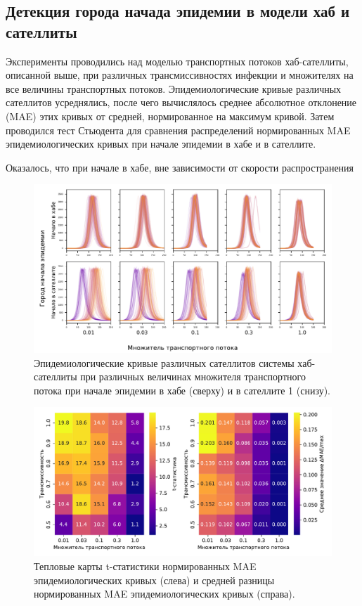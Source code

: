 \documentclass[a4paper,12pt]{article} %
\begin{document}
\subsection{Детекция города начада эпидемии в модели хаб и сателлиты}

Эксперименты проводились над моделью транспортных потоков хаб-сателлиты, описанной выше, при различных трансмиссивностях инфекции и множителях на все величины транспортных потоков. Эпидемиологические кривые различных сателлитов усреднялись, после чего вычислялось среднее абсолютное отклонение (MAE) этих кривых от средней, нормированное на максимум кривой. Затем проводился тест Стьюдента для сравнения распределений нормированных MAE эпидемиологических кривых при начале эпидемии в хабе и в сателлите.

 Оказалось, что при начале в хабе, вне зависимости от скорости распространения 
 
 \begin{figure}[H]
    \centering
    \includegraphics[width=\linewidth]{images/diffsatellites_demos.pdf}
    \caption{Эпидемиологические кривые различных сателлитов системы хаб-сателлиты при различных величинах множителя транспортного потока при начале эпидемии в хабе (сверху) и в сателлите 1 (снизу).}
    \label{pic:diffsatellites_demos}
\end{figure}

\begin{figure}[H]
    \centering
    \includegraphics[width=\linewidth]{images/diffsatellites_heatmaps.pdf}
    \caption{Тепловые карты t-статистики нормированных MAE эпидемиологических кривых (слева) и средней разницы нормированных MAE эпидемиологических кривых (справа).}
    \label{pic:diffsatellites_heatmaps}
\end{figure}
\end{document}
